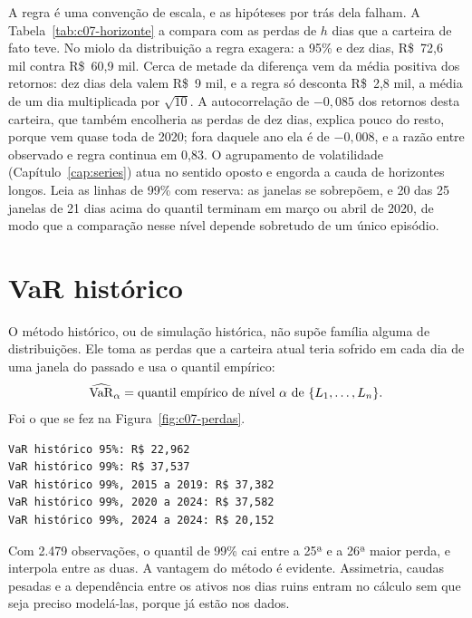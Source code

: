A regra é uma convenção de escala, e as hipóteses por trás dela falham. A Tabela~\ref{tab:c07-horizonte} a compara com as perdas de $h$ dias que a carteira de fato teve. No miolo da distribuição a regra exagera: a 95\% e dez dias, R\$~72,6 mil contra R\$~60,9 mil. Cerca de metade da diferença vem da média positiva dos retornos: dez dias dela valem R\$~9 mil, e a regra só desconta R\$~2,8 mil, a média de um dia multiplicada por $\sqrt{10}$. A autocorrelação de $-0,085$ dos retornos desta carteira, que também encolheria as perdas de dez dias, explica pouco do resto, porque vem quase toda de 2020; fora daquele ano ela é de $-0,008$, e a razão entre observado e regra continua em 0,83. O agrupamento de volatilidade (Capítulo~\ref{cap:series}) atua no sentido oposto e engorda a cauda de horizontes longos. Leia as linhas de 99\% com reserva: as janelas se sobrepõem, e 20 das 25 janelas de 21 dias acima do quantil terminam em março ou abril de 2020, de modo que a comparação nesse nível depende sobretudo de um único episódio.

\section{VaR histórico}

O método histórico, ou de simulação histórica, não supõe família alguma de distribuições. Ele toma as perdas que a carteira atual teria sofrido em cada dia de uma janela do passado e usa o quantil empírico:
\begin{equation}
  \widehat{\operatorname{VaR}}_\alpha = \text{quantil empírico de nível } \alpha \text{ de } \{L_1, \dots, L_n\} .
\end{equation}
Foi o que se fez na Figura~\ref{fig:c07-perdas}.


\begin{lstlisting}[style=saida]
VaR histórico 95%: R$ 22,962
VaR histórico 99%: R$ 37,537
VaR histórico 99%, 2015 a 2019: R$ 37,382
VaR histórico 99%, 2020 a 2024: R$ 37,582
VaR histórico 99%, 2024 a 2024: R$ 20,152
\end{lstlisting}

Com 2.479 observações, o quantil de 99\% cai entre a 25ª e a 26ª maior perda, e  interpola entre as duas. A vantagem do método é evidente. Assimetria, caudas pesadas e a dependência entre os ativos nos dias ruins entram no cálculo sem que seja preciso modelá-las, porque já estão nos dados.

